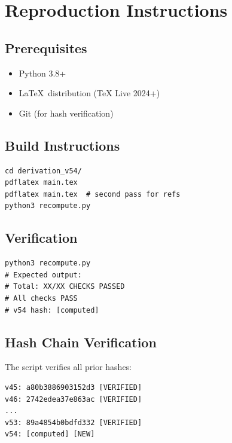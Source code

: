 \documentclass[11pt,a4paper]{article}
\begin{document}
\section{Reproduction Instructions}
\label{app:reproduction}

\subsection{Prerequisites}
\label{app:prereq}

\begin{canonbox}[Prerequisites]
\label{box:prereq}
\begin{itemize}
    \item Python 3.8+
    \item \LaTeX\ distribution (TeX Live 2024+)
    \item Git (for hash verification)
\end{itemize}
\end{canonbox}

\subsection{Build Instructions}
\label{app:build}

\begin{verbatim}
cd derivation_v54/
pdflatex main.tex
pdflatex main.tex  # second pass for refs
python3 recompute.py
\end{verbatim}

\subsection{Verification}
\label{app:verify}

\begin{verbatim}
python3 recompute.py
# Expected output:
# Total: XX/XX CHECKS PASSED
# All checks PASS
# v54 hash: [computed]
\end{verbatim}

\subsection{Hash Chain Verification}
\label{app:hash-verify}

The script verifies all prior hashes:
\begin{verbatim}
v45: a80b3886903152d3 [VERIFIED]
v46: 2742edea37e863ac [VERIFIED]
...
v53: 89a4854b0bdfd332 [VERIFIED]
v54: [computed] [NEW]
\end{verbatim}
\end{document}
